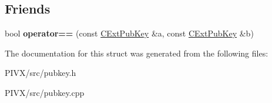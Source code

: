 \subsection*{Friends}
\begin{DoxyCompactItemize}
\item 
\mbox{\label{struct_c_ext_pub_key_a21fdc5351d6df62ce501f57bc1e1c9e6}} 
bool {\bfseries operator==} (const \mbox{\hyperlink{struct_c_ext_pub_key}{C\+Ext\+Pub\+Key}} \&a, const \mbox{\hyperlink{struct_c_ext_pub_key}{C\+Ext\+Pub\+Key}} \&b)
\end{DoxyCompactItemize}


The documentation for this struct was generated from the following files\+:\begin{DoxyCompactItemize}
\item 
P\+I\+V\+X/src/pubkey.\+h\item 
P\+I\+V\+X/src/pubkey.\+cpp\end{DoxyCompactItemize}
